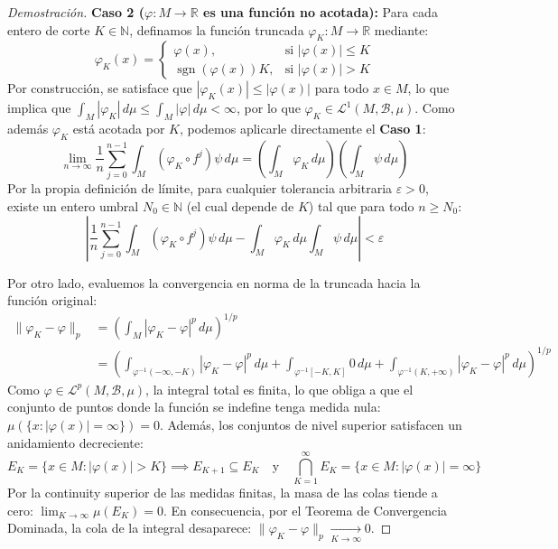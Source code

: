 \begin{proof}[Demostración]
	\textbf{Caso 2 ($\varphi: M \to \mathbb{R}$ es una función no acotada):}
	Para cada entero de corte $K \in \mathbb{N}$, definamos la función truncada $\varphi_K: M \to \mathbb{R}$ mediante:
	$$ \varphi_K(x) = \begin{cases} \varphi(x), & \text{si } |\varphi(x)| \le K \\ \operatorname{sgn}(\varphi(x))K, & \text{si } |\varphi(x)| > K \end{cases} $$
	Por construcción, se satisface que $|\varphi_K(x)| \le |\varphi(x)|$ para todo $x \in M$, lo que implica que $\int_M |\varphi_K| \, d\mu \le \int_M |\varphi| \, d\mu < \infty$, por lo que $\varphi_K \in \mathcal{L}^1(M, \mathcal{B}, \mu)$. Como además $\varphi_K$ está acotada por $K$, podemos aplicarle directamente el \textbf{Caso 1}:
	$$ \lim_{n \to \infty} \frac{1}{n} \sum_{j=0}^{n-1} \int_M (\varphi_K \circ f^j)\psi \, d\mu = \left( \int_M \varphi_K \, d\mu \right) \left( \int_M \psi \, d\mu \right) $$
	Por la propia definición de límite, para cualquier tolerancia arbitraria $\varepsilon > 0$, existe un entero umbral $N_0 \in \mathbb{N}$ (el cual depende de $K$) tal que para todo $n \ge N_0$:
	\begin{equation}
		\left| \frac{1}{n} \sum_{j=0}^{n-1} \int_M (\varphi_K \circ f^j)\psi \, d\mu - \int_M \varphi_K \, d\mu \int_M \psi \, d\mu \right| < \varepsilon \label{eq:esp_I}
	\end{equation}
	
	Por otro lado, evaluemos la convergencia en norma de la truncada hacia la función original:
	\begin{align*}
		\|\varphi_K - \varphi\|_p &= \left( \int_M |\varphi_K - \varphi|^p \, d\mu \right)^{1/p} \\
		&= \left( \int_{\varphi^{-1}(-\infty, -K)} |\varphi_K - \varphi|^p \, d\mu + \int_{\varphi^{-1}[-K, K]} 0 \, d\mu + \int_{\varphi^{-1}(K, +\infty)} |\varphi_K - \varphi|^p \, d\mu \right)^{1/p}
	\end{align*}
	Como $\varphi \in \mathcal{L}^p(M, \mathcal{B}, \mu)$, la integral total es finita, lo que obliga a que el conjunto de puntos donde la función se indefine tenga medida nula: $\mu(\{x : |\varphi(x)| = \infty\}) = 0$. Además, los conjuntos de nivel superior satisfacen un anidamiento decreciente:
	$$ E_K = \{x \in M : |\varphi(x)| > K\} \implies E_{K+1} \subseteq E_K \quad \text{y} \quad \bigcap_{K=1}^\infty E_K = \{x \in M : |\varphi(x)| = \infty\} $$
	Por la continuity superior de las medidas finitas, la masa de las colas tiende a cero: $\lim_{K \to \infty} \mu(E_K) = 0$. En consecuencia, por el Teorema de Convergencia Dominada, la cola de la integral desaparece: $\|\varphi_K - \varphi\|_p \xrightarrow[K \to \infty]{} 0$.
	

\end{proof}
